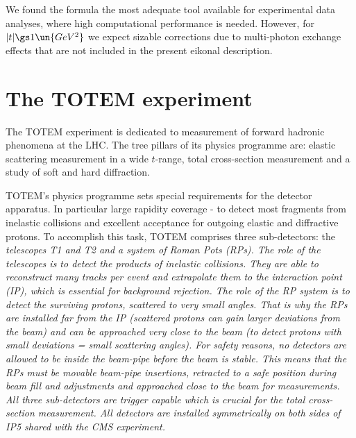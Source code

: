 
We found the \KL{} formula the most adequate tool available for experimental data analyses, where high computational performance is needed. However, for $|t| \gs 1\un{GeV^2}$ we expect sizable corrections due to multi-photon exchange effects that are not included in the present eikonal description.


\chapter[ttm]{The TOTEM experiment}

The TOTEM experiment  is dedicated to measurement of forward hadronic phenomena at the LHC. The tree pillars of its physics programme are: elastic scattering measurement in a wide $t$-range, total cross-section measurement and a study of soft and hard diffraction.

TOTEM's physics programme sets special requirements for the detector apparatus. In particular large rapidity coverage - to detect most fragments from inelastic collisions and excellent acceptance for outgoing elastic and diffractive protons. To accomplish this task, TOTEM comprises three sub-detectors: the \em{telescopes T1 and T2} and a system of \em{Roman Pots} (RPs). The role of the telescopes is to detect the products of inelastic collisions. They are able to reconstruct many tracks per event and extrapolate them to the interaction point (IP), which is essential for background rejection. The role of the RP system is to detect the surviving protons, scattered to very small angles. That is why the RPs are installed far from the IP (scattered protons can gain larger deviations from the beam) and can be approached very close to the beam (to detect protons with small deviations = small scattering angles). For safety reasons, no detectors are allowed to be inside the beam-pipe before the beam is stable. This means that the RPs must be movable beam-pipe insertions, retracted to a safe position during beam fill and adjustments and approached close to the beam for measurements. All three sub-detectors are trigger capable which is crucial for the total cross-section measurement. All detectors are installed symmetrically on both sides of IP5 shared with the CMS experiment.

